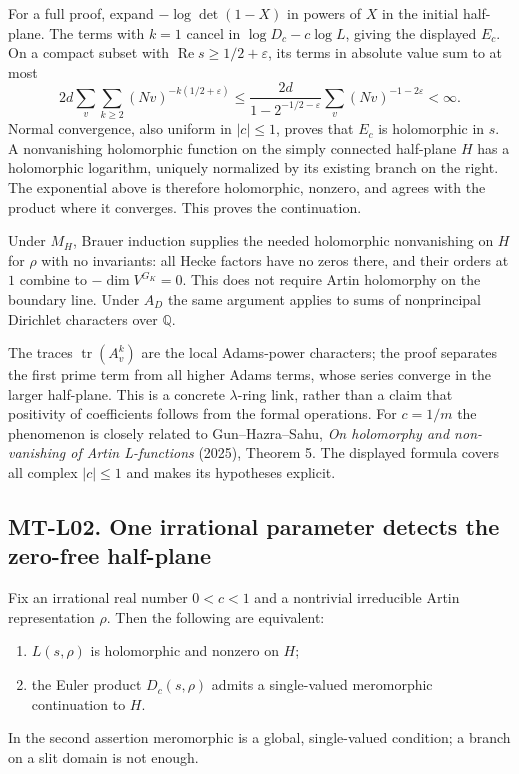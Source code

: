 For a full proof, expand $-\log\det(1-X)$ in powers of $X$ in the initial
half-plane.  The terms with $k=1$ cancel in
$\log D_c-c\log L$, giving the displayed $E_c$.  On a compact subset with
$\operatorname{Re}s\ge1/2+\varepsilon$, its terms in absolute value sum to
at most
\[
 2d\sum_v\sum_{k\ge2}(Nv)^{-k(1/2+\varepsilon)}
 \le \frac{2d}{1-2^{-1/2-\varepsilon}}
       \sum_v(Nv)^{-1-2\varepsilon}<\infty.
\]
Normal convergence, also uniform in $|c|\le1$, proves that $E_c$ is
holomorphic in $s$.  A nonvanishing holomorphic function on the simply
connected half-plane $H$ has a holomorphic logarithm, uniquely normalized
by its existing branch on the right.  The exponential above is therefore
holomorphic, nonzero, and agrees with the product where it converges.
This proves the continuation.

Under $M_H$, Brauer induction supplies the needed holomorphic nonvanishing
on $H$ for $\rho$ with no invariants: all Hecke factors have no zeros
there, and their orders at $1$ combine to
$-\dim V^{G_K}=0$.  This does not require Artin holomorphy on the boundary
line.  Under $A_D$ the same argument applies to sums of nonprincipal
Dirichlet characters over $\mathbb Q$.

The traces $\operatorname{tr}(A_v^k)$ are the local Adams-power characters;
the proof separates the first prime term from all higher Adams terms,
whose series converge in the larger half-plane.  This is a concrete
$\lambda$-ring link, rather than a claim that positivity of coefficients
follows from the formal operations.  For $c=1/m$ the phenomenon is closely
related to Gun--Hazra--Sahu, \emph{On holomorphy and non-vanishing of Artin
L-functions} (2025), Theorem 5.  The displayed formula covers all complex
$|c|\le1$ and makes its hypotheses explicit.

\subsection*{MT-L02. One irrational parameter detects the zero-free half-plane}
Fix an irrational real number $0<c<1$ and a nontrivial irreducible Artin
representation $\rho$.  Then the following are equivalent:
\begin{enumerate}
 \item $L(s,\rho)$ is holomorphic and nonzero on $H$;
 \item the Euler product $D_c(s,\rho)$ admits a single-valued meromorphic
       continuation to $H$.
\end{enumerate}
In the second assertion meromorphic is a global, single-valued condition;
a branch on a slit domain is not enough.

